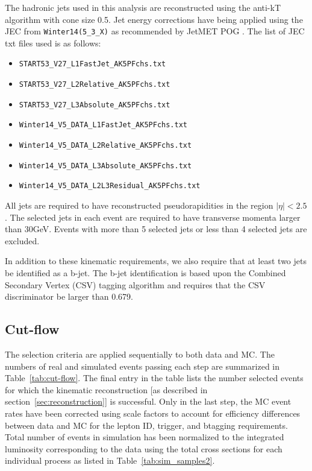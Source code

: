 \documentclass{cmspaperpdf}
\begin{document}
The hadronic jets used in this analysis are reconstructed using the anti-kT algorithm with cone size 0.5. Jet energy corrections have being applied using the JEC from \texttt{Winter14(5\_3\_X)} as recommended by JetMET POG \cite{JEC_intro}\cite{JEC_paper}. The list of JEC txt files used is as follows:
\begin{itemize}
\item \texttt{START53\_V27\_L1FastJet\_AK5PFchs.txt}
\item \texttt{START53\_V27\_L2Relative\_AK5PFchs.txt}
\item \texttt{START53\_V27\_L3Absolute\_AK5PFchs.txt}
\item \texttt{Winter14\_V5\_DATA\_L1FastJet\_AK5PFchs.txt}
\item \texttt{Winter14\_V5\_DATA\_L2Relative\_AK5PFchs.txt}
\item \texttt{Winter14\_V5\_DATA\_L3Absolute\_AK5PFchs.txt}
\item \texttt{Winter14\_V5\_DATA\_L2L3Residual\_AK5PFchs.txt}
\end{itemize}  

All jets are required to have reconstructed pseudorapidities in the region $|\eta|<2.5$.  The selected jets in each event are required to have transverse momenta larger than 30GeV. Events with more than 5 selected jets or less than 4 selected jets are excluded. 

In addition to these kinematic requirements, we also require that at least two jets be identified as a b-jet.  The b-jet identification is based upon the Combined Secondary Vertex (CSV) tagging algorithm \cite{CSV_note} and requires that the CSV discriminator be larger than 0.679.

\subsection{Cut-flow}

The selection criteria are applied sequentially to both data and MC.  The numbers of real and simulated events passing each step are summarized in Table~\ref{tab:cut-flow}.  The final entry in the table lists the number selected events for which the kinematic reconstruction [as described in section~\ref{sec:reconstruction}] is successful. Only in the last step, the MC event rates have been corrected using scale factors to account for efficiency differences between data and MC for the lepton ID, trigger, and btagging requirements. Total number of events in simulation has been normalized to the integrated luminosity corresponding to the data using the total cross sections for each individual process as listed in Table~\ref{tab:sim_samples2}. 
\end{document}
